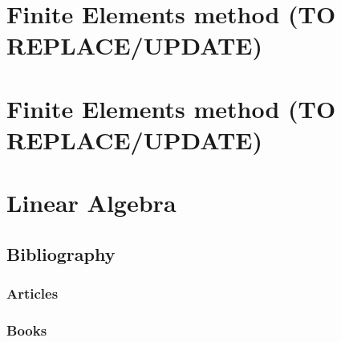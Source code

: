 \documentclass[11pt,fleqn]{book} %
\begin{document}
\part{Finite Elements method (TO REPLACE/UPDATE)}




\part{Finite Elements method (TO REPLACE/UPDATE)}




\part{Linear Algebra}




\chapter*{Bibliography}


\section*{Articles}
\printbibliography[heading=bibempty,type=article]


\section*{Books}
\printbibliography[heading=bibempty,type=book]
\end{document}
